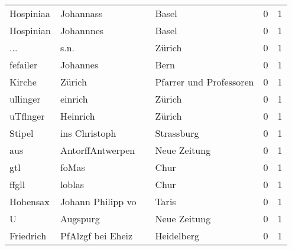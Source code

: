 \begin{center}
\begin{tiny}
\begin{longtabu}{llllrr}
                Hospiniaa &                          Johannass &             &                                       Basel &          0 &         1 \\
                Hospinian &                          Johannnes &             &                                       Basel &          0 &         1 \\
                      ... &                               s.n. &             &                                      Zürich &          0 &         1 \\
                 fefailer &                           Johannes &             &                                        Bern &          0 &         1 \\
                   Kirche &                             Zürich &             &                     Pfarrer und Professoren &          0 &         1 \\
                 ullinger &                            einrich &             &                                      Zürich &          0 &         1 \\
                 uTflnger &                           Heinrich &             &                                      Zürich &          0 &         1 \\
                   Stipel &                      ins Christoph &             &                                  Strassburg &          0 &         1 \\
                      aus &                   AntorffAntwerpen &             &                                Neue Zeitung &          0 &         1 \\
                      gtl &                              foMas &             &                                        Chur &          0 &         1 \\
                    ffgll &                             loblas &             &                                        Chur &          0 &         1 \\
                 Hohensax &                  Johann Philipp vo &             &                                       Taris &          0 &         1 \\
                        U &                           Augspurg &             &                                Neue Zeitung &          0 &         1 \\
                Friedrich &                  PfAlzgf bei Eheiz &             &                                  Heidelberg &          0 &         1 \\

\end{longtabu}
\end{tiny}
\end{center}
